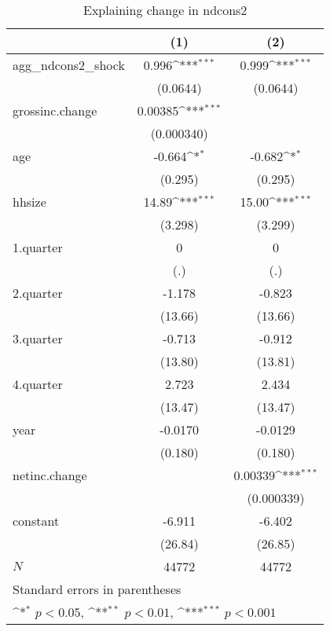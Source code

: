 \begin{table}[htbp]\centering
\def\sym#1{\ifmmode^{#1}\else\(^{#1}\)\fi}
\caption{\label{tab:ndcons2-deltacons} Explaining change in ndcons2}
\begin{tabular}{l*{2}{c}}
\hline\hline
            &\multicolumn{1}{c}{(1)}         &\multicolumn{1}{c}{(2)}         \\
\hline
agg\_ndcons2\_shock&       0.996\sym{***}&       0.999\sym{***}\\
            &    (0.0644)         &    (0.0644)         \\
grossinc.change&     0.00385\sym{***}&                     \\
            &  (0.000340)         &                     \\
age         &      -0.664\sym{*}  &      -0.682\sym{*}  \\
            &     (0.295)         &     (0.295)         \\
hhsize      &       14.89\sym{***}&       15.00\sym{***}\\
            &     (3.298)         &     (3.299)         \\
1.quarter   &           0         &           0         \\
            &         (.)         &         (.)         \\
2.quarter   &      -1.178         &      -0.823         \\
            &     (13.66)         &     (13.66)         \\
3.quarter   &      -0.713         &      -0.912         \\
            &     (13.80)         &     (13.81)         \\
4.quarter   &       2.723         &       2.434         \\
            &     (13.47)         &     (13.47)         \\
year        &     -0.0170         &     -0.0129         \\
            &     (0.180)         &     (0.180)         \\
netinc.change&                     &     0.00339\sym{***}\\
            &                     &  (0.000339)         \\
constant    &      -6.911         &      -6.402         \\
            &     (26.84)         &     (26.85)         \\
\hline
\(N\)       &       44772         &       44772         \\
\hline\hline
\multicolumn{3}{l}{\footnotesize Standard errors in parentheses}\\
\multicolumn{3}{l}{\footnotesize \sym{*} \(p<0.05\), \sym{**} \(p<0.01\), \sym{***} \(p<0.001\)}\\
\end{tabular}
\end{table}
